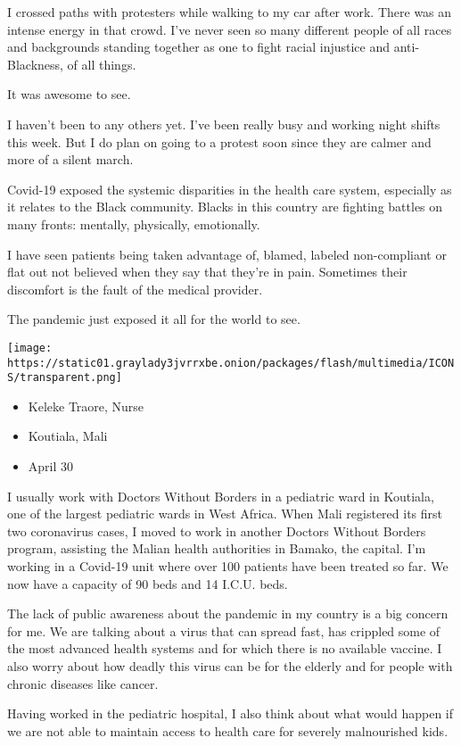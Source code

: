 I crossed paths with protesters while walking to my car after work.
There was an intense energy in that crowd. I've never seen so many
different people of all races and backgrounds standing together as one
to fight racial injustice and anti-Blackness, of all things.

It was awesome to see.

I haven't been to any others yet. I've been really busy and working
night shifts this week. But I do plan on going to a protest soon since
they are calmer and more of a silent march.

Covid-19 exposed the systemic disparities in the health care system,
especially as it relates to the Black community. Blacks in this country
are fighting battles on many fronts: mentally, physically, emotionally.

I have seen patients being taken advantage of, blamed, labeled
non-compliant or flat out not believed when they say that they're in
pain. Sometimes their discomfort is the fault of the medical provider.

The pandemic just exposed it all for the world to see.

\texttt{[image: https://static01.graylady3jvrrxbe.onion/packages/flash/multimedia/ICONS/transparent.png]}

\begin{itemize}
\tightlist
\item
  Keleke Traore, Nurse
\item
  Koutiala, Mali
\item
  April 30
\end{itemize}

I usually work with Doctors Without Borders in a pediatric ward in
Koutiala, one of the largest pediatric wards in West Africa. When Mali
registered its first two coronavirus cases, I moved to work in another
Doctors Without Borders program, assisting the Malian health authorities
in Bamako, the capital. I'm working in a Covid-19 unit where over 100
patients have been treated so far. We now have a capacity of 90 beds and
14 I.C.U. beds.

The lack of public awareness about the pandemic in my country is a big
concern for me. We are talking about a virus that can spread fast, has
crippled some of the most advanced health systems and for which there is
no available vaccine. I also worry about how deadly this virus can be
for the elderly and for people with chronic diseases like cancer.

Having worked in the pediatric hospital, I also think about what would
happen if we are not able to maintain access to health care for severely
malnourished kids.


